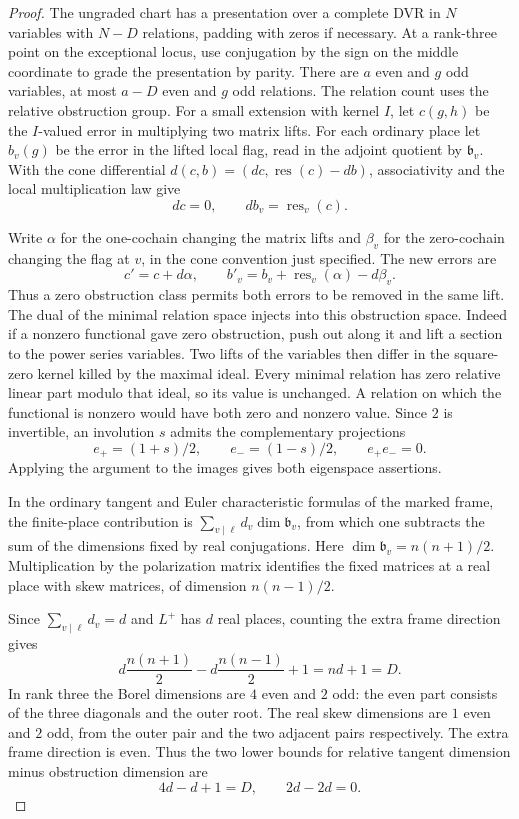 \begin{proof}
The ungraded chart has a presentation over a complete DVR in
\(N\) variables with \(N-D\) relations, padding with zeros if
necessary. At a rank-three point on the exceptional locus, use
conjugation by the sign on the middle coordinate to grade the
presentation by parity. There are \(a\) even and \(g\) odd
variables, at most \(a-D\) even and \(g\) odd relations. The relation count uses the relative obstruction group.
For a small extension with kernel \(I\), let \(c(g,h)\) be
the \(I\)-valued error in multiplying two matrix lifts.
For each ordinary place let \(b_v(g)\) be the error in the
lifted local flag, read in the adjoint quotient by
\(\mathfrak b_v\). With the cone differential
\(d(c,b)=(dc,\operatorname{res}(c)-db)\), associativity
and the local multiplication law give
\[
      dc=0,\qquad db_v=\operatorname{res}_v(c).
\]

Write \(\alpha\) for the one-cochain changing the matrix
lifts and \(\beta_v\) for the zero-cochain changing the flag at
\(v\), in the cone convention just specified. The new errors are
\[
 c'=c+d\alpha,\qquad
 b'_v=b_v+\operatorname{res}_v(\alpha)-d\beta_v .
\]
Thus a zero obstruction class permits both errors to be removed
in the same lift. The dual
of the minimal relation space injects into this obstruction
space. Indeed if a nonzero functional gave zero obstruction,
push out along it and lift a section to the power series variables.
Two lifts of the variables then differ in the square-zero
kernel killed by the maximal ideal. Every minimal relation has
zero relative linear part modulo that ideal, so its value is
unchanged. A relation on which the functional is nonzero would
have both zero and nonzero value. Since \(2\) is invertible, an involution \(s\) admits the complementary projections
\[
 e_+=(1+s)/2,\qquad e_-=(1-s)/2,\qquad e_+e_-=0.
\]
Applying the argument to the images gives both eigenspace assertions.

In the ordinary tangent and Euler characteristic formulas of
the marked frame, the finite-place contribution is
\(\sum_{v\mid\ell}d_v\dim\mathfrak b_v\), from which one subtracts the
sum of the dimensions fixed by real conjugations. Here
\(\dim\mathfrak b_v=n(n+1)/2\). Multiplication by the
polarization matrix identifies the fixed matrices at a real
place with skew matrices, of dimension \(n(n-1)/2\).

Since \(\sum_{v\mid\ell}d_v=d\) and \(L^+\) has \(d\) real
places, counting the extra frame direction gives
\[
 d\frac{n(n+1)}2-d\frac{n(n-1)}2+1=nd+1=D .
\]
In rank three the Borel dimensions are \(4\) even and \(2\) odd:
the even part consists of the three diagonals and the outer root.
The real skew dimensions are \(1\) even and \(2\) odd, from the
outer pair and the two adjacent pairs respectively. The extra
frame direction is even. Thus the two lower bounds for relative
tangent dimension minus obstruction dimension are
\[
        4d-d+1=D,\qquad 2d-2d=0.
\]


\end{proof}
